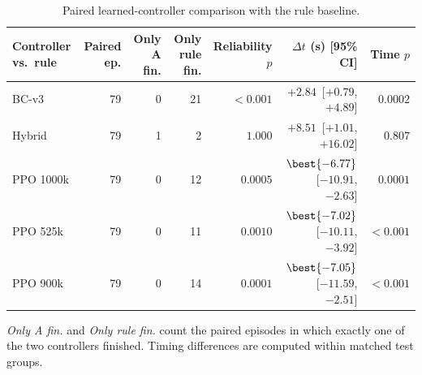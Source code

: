\begin{table}[t]
\centering
\caption{Paired learned-controller comparison with the rule baseline.}
\label{tab:learning_paired}
\mratablestyle
\begin{tabular}{@{}lrrrrrr@{}}
\toprule
Controller vs.\ rule & Paired ep. & Only A fin. & Only rule fin. & Reliability $p$ & $\Delta t$ (s) [95\% CI] & Time $p$ \\
\midrule
BC-v3      & 79 & 0 & 21 & $<\!0.001$ & $+2.84$ \,[$+0.79$, $+4.89$] & $0.0002$ \\
Hybrid     & 79 & 1 & 2  & $1.000$ & $+8.51$ \,[$+1.01$, $+16.02$] & $0.807$ \\
PPO 1000k  & 79 & 0 & 12 & $0.0005$ & $\best{-6.77}$ \,[$-10.91$, $-2.63$] & $0.0001$ \\
PPO 525k   & 79 & 0 & 11 & $0.0010$ & $\best{-7.02}$ \,[$-10.11$, $-3.92$] & $<\!0.001$ \\
PPO 900k   & 79 & 0 & 14 & $0.0001$ & $\best{-7.05}$ \,[$-11.59$, $-2.51$] & $<\!0.001$ \\
\bottomrule
\end{tabular}
\mratablenote
\emph{Only A fin.} and \emph{Only rule fin.} count the paired episodes in which
exactly one of the two controllers finished. Timing differences are computed
within matched test groups.
\end{table}

